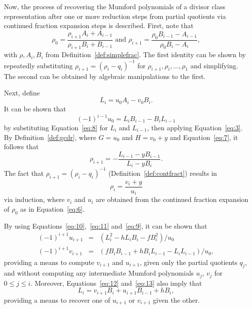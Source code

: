 Now, the process of recovering the Mumford polynomials of a divisor class
representation after one or more reduction steps from partial quotients via
continued fraction expansion steps is described. First, note
that\begin{equation}\label{eq:7}
\rho_0 = \frac{\rho_{i+1}A_i + A_{i-1}}{\rho_{i+1}B_i + B_{i-1}} \mbox{ and }
\rho_{i+1} = \frac{\rho_0B_{i-1} - A_{i-1}}{\rho_0B_i - A_i}, \end{equation}
with $\rho, A_i, B_i$ from Definition~\ref{def:simplefrac}. The first identity
can be shown by repeatedly substituting $\rho_{i+1} = (\rho_i - q_i)^{-1}$ for
$\rho_{i+1},\rho_{i},...,\rho_1$ and simplifying. The second can be obtained by
algebraic manipulations to the first.

Next, define \begin{equation} \label{eq:8}
    L_i = u_0A_i - v_0B_i.
\end{equation} It can be shown that 
\begin{equation}\label{eq:9}
    (-1)^{i-1}u_0 = L_iB_{i-1} - B_iL_{i-1} 
\end{equation} by substituting
Equation~\eqref{eq:8} for $L_i$ and $L_{i-1}$, then applying Equation~\eqref{eq:3}.
By Definition~\ref{def:gcdr},  where $G = u_0$ and $H = v_0 + y$ and
Equation~\eqref{eq:7}, it follows that 
\begin{equation} \label{eq:10} 
    \rho_{i+1} = -\frac{L_{i-1} - yB_{i-1}}{L_i - yB_i}. 
\end{equation} 
The fact that $\rho_{i+1} = (\rho_i - q_i)^{-1}$
(Definition~\ref{def:contfract}) results in
\begin{equation} \label{eq:11}
    \rho_i = \frac{v_i + y}{u_i}
\end{equation} 
via induction, where $v_i$ and $u_i$ are obtained from the
continued fraction expansion of $\rho_0$ as in Equation~\eqref{eq:6}.

By using Equations~\eqref{eq:10},~\eqref{eq:11} and~\eqref{eq:9}, it can be shown that 
\begin{eqnarray}
(-1)^{i+1}u_{i + 1} &=& (L_i^2 - hL_iB_i - fB_i^2)/u_0 \label{eq:12} \\ 
(-1)^{i+1}v_{i + 1} &=& (fB_iB_{i-1} + hB_iL_{i-1} - L_iL_{i-1})/u_0, \label{eq:13} 
\end{eqnarray} 
providing a means to compute $v_{i+1}$ and $u_{i+1}$, given only the partial
quotients $q_j$, and without computing any intermediate Mumford polynomials
$u_j$, $v_j$ for $0 \leq j \leq i$. Moreover, Equations~\eqref{eq:12}
and~\eqref{eq:13} also imply that
\begin{equation} 
L_i = v_{i+1}B_i + u_{i+1}B_{i-1} + hB_i,
\end{equation}
providing a means to recover one of $u_{i+1}$ or $v_{i+1}$ given the other.

